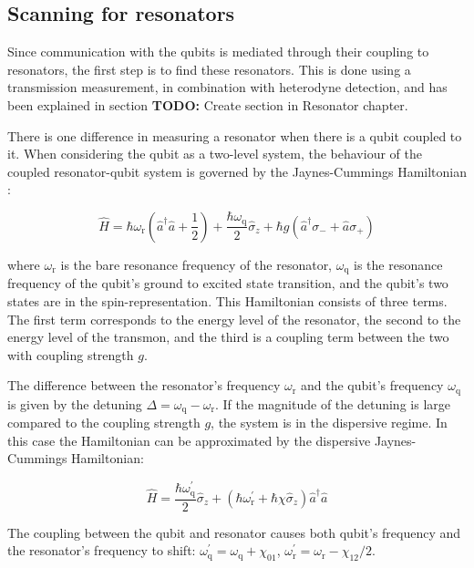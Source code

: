 \documentclass[12pt]{report}
\newcommand{\wres}{\omega_\text{r}}
\newcommand{\wqub}{\omega_\text{q}}
\begin{document}
      \subsection{Scanning for resonators}
      \label{sec:resonator-scan}
        Since communication with the qubits is mediated through their coupling to resonators, the first step is to find these resonators. This is done using a transmission measurement, in combination with heterodyne detection, and has been explained in section \textbf{TODO:} Create section in Resonator chapter.

        There is one difference in measuring a resonator when there is a qubit coupled to it. When considering the qubit as a two-level system, the behaviour of the coupled resonator-qubit system is governed by the Jaynes-Cummings Hamiltonian \cite{Reed}:

        \begin{equation}
          \hat{H} = \hbar \wres\left(\hat{a}^\dagger \hat{a} + \frac{1}{2} \right) + \frac{\hbar \wqub}{2}\hat{\sigma}_z + \hbar g \left(\hat{a}^\dagger \sigma_{-} + \hat{a}\sigma_{+}\right)
          \label{eq:Jaynes-Cummings}
        \end{equation}

        where $\wres$ is the bare resonance frequency of the resonator, $\wqub$ is the resonance frequency of the qubit's ground to excited state transition, and the qubit's two states are in the spin-representation. This Hamiltonian consists of three terms. The first term corresponds to the energy level of the resonator, the second to the energy level of the transmon, and the third is a coupling term between the two with coupling strength $g$.

        The difference between the resonator's frequency $\wres$ and the qubit's frequency $\wqub$ is given by the detuning $\Delta = \wqub - \wres$. If the magnitude of the detuning is large compared to the coupling strength $g$, the system is in the dispersive regime. In this case the Hamiltonian can be approximated by the dispersive Jaynes-Cummings Hamiltonian:

        \begin{equation}
          \hat{H} = \frac{\hbar \wqub^{'}}{2} \hat{\sigma}_z +  \left(\hbar \wres^{'} + \hbar \chi \hat{\sigma}_z\right) \hat{a}^\dagger \hat{a}
          \label{eq:dispersive-Jaynes-Cummings}
        \end{equation}

        The coupling between the qubit and resonator causes both qubit's frequency and the resonator's frequency to shift: $\wqub^{'} = \wqub + \chi_{01}$, $\wres^{'}=\wres - \chi_{12}/2$.
\end{document}
